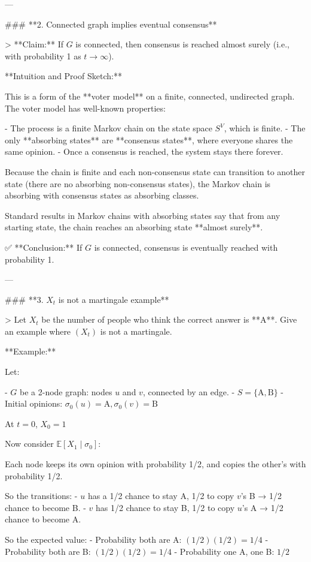 \begin{enumerate}
\begin{shaded}
\begin{enumerate}
---

### **2. Connected graph implies eventual consensus**

> **Claim:** If \( G \) is connected, then consensus is reached almost surely (i.e., with probability 1 as \( t \to \infty \)).

**Intuition and Proof Sketch:**

This is a form of the **voter model** on a finite, connected, undirected graph. The voter model has well-known properties:

- The process is a finite Markov chain on the state space \( S^V \), which is finite.
- The only **absorbing states** are **consensus states**, where everyone shares the same opinion.
- Once a consensus is reached, the system stays there forever.

Because the chain is finite and each non-consensus state can transition to another state (there are no absorbing non-consensus states), the Markov chain is absorbing with consensus states as absorbing classes.

Standard results in Markov chains with absorbing states say that from any starting state, the chain reaches an absorbing state **almost surely**.

✅ **Conclusion:** If \( G \) is connected, consensus is eventually reached with probability 1.

---

### **3. \( X_t \) is not a martingale example**

> Let \( X_t \) be the number of people who think the correct answer is **A**. Give an example where \( (X_t) \) is not a martingale.

**Example:**

Let:

- \( G \) be a 2-node graph: nodes \( u \) and \( v \), connected by an edge.
- \( S = \{\text{A}, \text{B}\} \)
- Initial opinions: \( \sigma_0(u) = \text{A}, \sigma_0(v) = \text{B} \)

At \( t = 0 \), \( X_0 = 1 \)

Now consider \( \mathbb{E}[X_1 \mid \sigma_0] \):

Each node keeps its own opinion with probability 1/2, and copies the other's with probability 1/2.

So the transitions:
- \( u \) has a 1/2 chance to stay A, 1/2 to copy \( v \)'s B → 1/2 chance to become B.
- \( v \) has 1/2 chance to stay B, 1/2 to copy \( u \)'s A → 1/2 chance to become A.

So the expected value:
- Probability both are A: \( (1/2)(1/2) = 1/4 \)
- Probability both are B: \( (1/2)(1/2) = 1/4 \)
- Probability one A, one B: \( 1/2 \)


\end{enumerate}
\end{shaded}
\end{enumerate}
